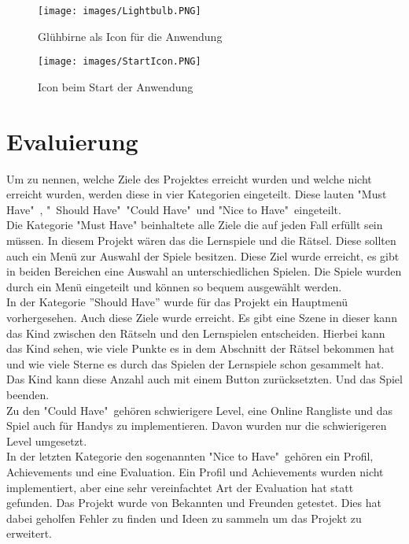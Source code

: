 \begin{figure}[htbp]
  \centering
  \texttt{[image: images/Lightbulb.PNG]}
  \caption{Glühbirne als Icon für die Anwendung}
  \label{Lightbulb}
\end{figure}
\begin{figure}[htbp]
  \centering
  \texttt{[image: images/StartIcon.PNG]}
  \caption{Icon beim Start der Anwendung}
  \label{BrainBook}
\end{figure}

\chapter{Evaluierung}
Um zu nennen, welche Ziele des Projektes erreicht wurden und welche nicht erreicht wurden, werden diese in vier Kategorien eingeteilt. Diese lauten "Must Have"\ , "\ Should Have"\, "Could Have"\ und "Nice to Have"\ eingeteilt.\\
Die Kategorie "Must Have" beinhaltete alle Ziele die auf jeden Fall erfüllt sein müssen. In diesem Projekt wären das die Lernspiele und die Rätsel. Diese sollten auch ein Menü zur Auswahl der Spiele besitzen. Diese Ziel wurde erreicht, es gibt in beiden Bereichen eine Auswahl an unterschiedlichen Spielen. Die Spiele wurden durch ein Menü eingeteilt und können so bequem ausgewählt werden.\\
In der Kategorie ''Should Have'' wurde für das Projekt ein Hauptmenü vorhergesehen. Auch diese Ziele wurde erreicht. Es gibt eine Szene in dieser kann das Kind zwischen den Rätseln und den Lernspielen entscheiden. Hierbei kann das Kind sehen, wie viele Punkte es in dem Abschnitt der Rätsel bekommen hat und wie viele Sterne es durch das Spielen der Lernspiele schon gesammelt hat. Das Kind kann diese Anzahl auch mit einem Button zurücksetzten. Und das Spiel beenden.\\
Zu den "Could Have"\ gehören schwierigere Level, eine Online Rangliste und das Spiel auch für Handys zu implementieren. Davon wurden nur die schwierigeren Level umgesetzt.\\
In der letzten Kategorie den sogenannten "Nice to Have"\, gehören ein Profil, Achievements und eine Evaluation. Ein Profil und Achievements wurden nicht implementiert, aber eine sehr vereinfachtet Art der Evaluation hat statt gefunden. Das Projekt wurde von Bekannten und Freunden getestet. Dies hat dabei geholfen Fehler zu finden und Ideen zu sammeln um das Projekt zu erweitert.\\

